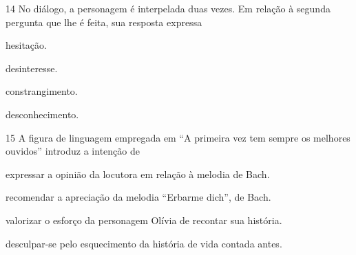 \num{14} No diálogo, a personagem é interpelada duas vezes. Em relação à segunda
pergunta que lhe é feita, sua resposta expressa

\begin{escolha}
\item hesitação.

\item desinteresse.

\item constrangimento.

\item desconhecimento.
\end{escolha}


\num{15} A figura de linguagem empregada em ``A primeira vez tem sempre os
melhores ouvidos'' introduz a intenção de

\begin{escolha}
\item expressar a opinião da locutora em relação à melodia de Bach.

\item recomendar a apreciação da melodia ``Erbarme dich'', de Bach.

\item valorizar o esforço da personagem Olívia de recontar sua história.

\item desculpar-se pelo esquecimento da história de vida contada antes.
\end{escolha}
